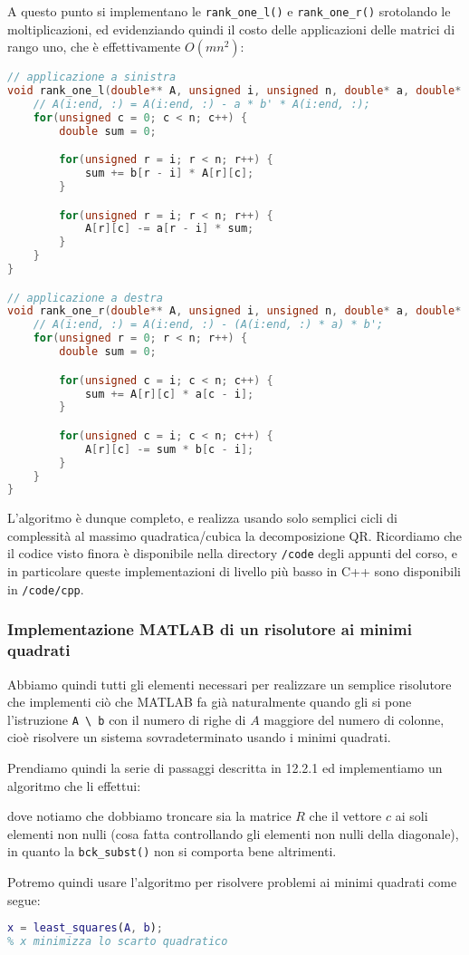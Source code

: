 \documentclass[a4paper,11pt]{article}
\begin{document}
A questo punto si implementano le \lstinline|rank_one_l()| e \lstinline|rank_one_r()| srotolando le moltiplicazioni, ed evidenziando quindi il costo delle applicazioni delle matrici di rango uno, che è effettivamente $O(mn^2)$:
\begin{lstlisting}[language=C++, style=codestyle]	
// applicazione a sinistra
void rank_one_l(double** A, unsigned i, unsigned n, double* a, double* b) {
	// A(i:end, :) = A(i:end, :) - a * b' * A(i:end, :);
	for(unsigned c = 0; c < n; c++) {
		double sum = 0;

		for(unsigned r = i; r < n; r++) {
			sum += b[r - i] * A[r][c]; 
		}

		for(unsigned r = i; r < n; r++) {
			A[r][c] -= a[r - i] * sum;
		}
	}
}

// applicazione a destra
void rank_one_r(double** A, unsigned i, unsigned n, double* a, double* b) {
	// A(i:end, :) = A(i:end, :) - (A(i:end, :) * a) * b';
	for(unsigned r = 0; r < n; r++) {
		double sum = 0;

		for(unsigned c = i; c < n; c++) {
			sum += A[r][c] * a[c - i]; 
		}

		for(unsigned c = i; c < n; c++) {
			A[r][c] -= sum * b[c - i];
		}
	}
}
\end{lstlisting}

L'algoritmo è dunque completo, e realizza usando solo semplici cicli di complessità al massimo quadratica/cubica la decomposizione QR.
Ricordiamo che il codice visto finora è disponibile nella directory \lstinline|/code| degli appunti del corso, e in particolare queste implementazioni di livello più basso in C++ sono disponibili in \lstinline|/code/cpp|.

\subsubsection{Implementazione MATLAB di un risolutore ai minimi quadrati}
Abbiamo quindi tutti gli elementi necessari per realizzare un semplice risolutore che implementi ciò che MATLAB fa già naturalmente quando gli si pone l'istruzione \lstinline|A \ b| con il numero di righe di $A$ maggiore del numero di colonne, cioè risolvere un sistema sovradeterminato usando i minimi quadrati.

Prendiamo quindi la serie di passaggi descritta in 12.2.1 ed implementiamo un algoritmo che li effettui:

dove notiamo che dobbiamo troncare sia la matrice $R$ che il vettore $c$ ai soli elementi non nulli (cosa fatta controllando gli elementi non nulli della diagonale), in quanto la \lstinline|bck_subst()| non si comporta bene altrimenti.

Potremo quindi usare l'algoritmo per risolvere problemi ai minimi quadrati come segue:
\begin{lstlisting}[language=matlab, style=codestyle]	
% dati A, b noti
x = least_squares(A, b);
% x minimizza lo scarto quadratico
\end{lstlisting}
\end{document}
